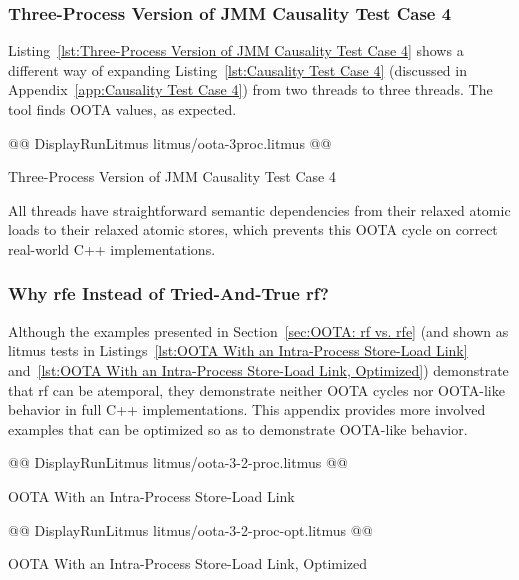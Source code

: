 \documentclass[10]{article}
\begin{document}
\subsubsection{Three-Process Version of JMM Causality Test Case 4}
\label{app:Three-Process Version of JMM Causality Test Case 4}

Listing~\ref{lst:Three-Process Version of JMM Causality Test Case 4}
shows a different way of expanding
Listing~\ref{lst:Causality Test Case 4}
(discussed in
Appendix~\ref{app:Causality Test Case 4})
from two threads to three threads.
The  tool finds OOTA values, as expected.

\begin{listing}[tbp]
@@ DisplayRunLitmus litmus/oota-3proc.litmus @@
\caption{Three-Process Version of JMM Causality Test Case 4}
\label{lst:Three-Process Version of JMM Causality Test Case 4}
\end{listing}

All threads have straightforward semantic dependencies from their
relaxed atomic loads to their relaxed atomic stores, which prevents this
OOTA cycle on correct real-world C++ implementations.

\subsubsection{Why rfe Instead of Tried-And-True rf?}
\label{app:Why rfe Instead of Tried-And-True rf?}

Although the examples presented in
Section~\ref{sec:OOTA: rf vs. rfe}
(and shown as litmus tests in
Listings~\ref{lst:OOTA With an Intra-Process Store-Load Link}
and~\ref{lst:OOTA With an Intra-Process Store-Load Link, Optimized})
demonstrate that rf can be atemporal, they demonstrate neither
OOTA cycles nor OOTA-like behavior in full C++ implementations.
This appendix provides more involved examples that can be optimized
so as to demonstrate OOTA-like behavior.

\begin{listing}[tbp]
@@ DisplayRunLitmus litmus/oota-3-2-proc.litmus @@
\caption{OOTA With an Intra-Process Store-Load Link}
\label{lst:OOTA With an Intra-Process Store-Load Link}
\end{listing}

\begin{listing}[tbp]
@@ DisplayRunLitmus litmus/oota-3-2-proc-opt.litmus @@
\caption{OOTA With an Intra-Process Store-Load Link, Optimized}
\label{lst:OOTA With an Intra-Process Store-Load Link, Optimized}
\end{listing}
\end{document}
